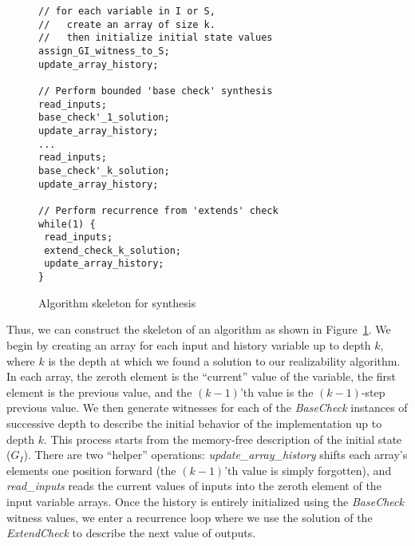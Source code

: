 \begin{figure}
\begin{small}
\begin{verbatim}
// for each variable in I or S,
//   create an array of size k.
//   then initialize initial state values
assign_GI_witness_to_S;
update_array_history;

// Perform bounded 'base check' synthesis
read_inputs;
base_check'_1_solution;
update_array_history;
...
read_inputs;
base_check'_k_solution;
update_array_history;

// Perform recurrence from 'extends' check
while(1) {
 read_inputs;
 extend_check_k_solution;
 update_array_history;
}
\end{verbatim}
\end{small}
\caption{Algorithm skeleton for synthesis}
\label{fig:algorithm}
\end{figure}

\noindent

Thus, we can construct the skeleton of an algorithm as shown in Figure~\ref{fig:algorithm}.  
We begin by creating an array for each input and history variable up to depth
$k$, where $k$ is the depth at which we found a solution to our realizability algorithm.
In each array, the zeroth element is the ``current'' value of the variable, the first element is the previous value, and the $(k-1)$'th value is the $(k-1)$-step previous value.
We then generate witnesses for each of the {\em BaseCheck} instances of
successive depth to describe the initial behavior of
the implementation up to depth $k$.  This process starts from the memory-free
description of the initial state ($G_I$).  There are two ``helper'' operations:
{\em update\_array\_history} shifts each array's elements one position forward
(the $(k-1)$'th value is simply forgotten), and {\em read\_inputs} reads the current values of inputs into the zeroth element of the input variable arrays.  Once the history is entirely initialized using the {\em BaseCheck} witness values, we enter a recurrence loop where we use the solution of the {\em ExtendCheck} to describe the next value of outputs.
 


